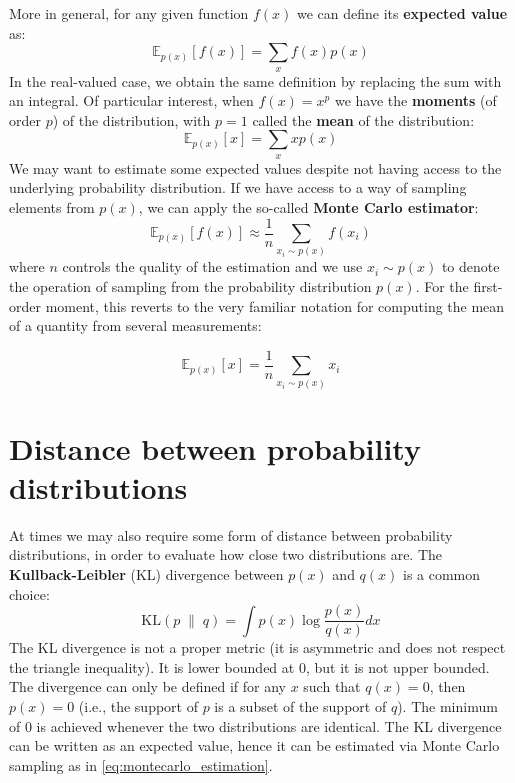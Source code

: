 More in general, for any given function $f(x)$ we can define its \textbf{expected value} as:
%
\begin{equation}
\mathbb{E}_{p(x)}\left[f(x)\right]=\sum_{x}f(x)p(x)
\label{eq:expected_value}
\end{equation}
%
In the real-valued case, we obtain the same definition by replacing the sum with an integral. Of particular interest, when $f(x)=x^p$ we have the \textbf{moments} (of order $p$) of the distribution, with $p=1$ called the \textbf{mean} of the distribution:
%
$$
\mathbb{E}_{p(x)}\left[x\right]=\sum_{x}xp(x)
$$
%
We may want to estimate some expected values despite not having access to the underlying probability distribution. If we have access to a way of sampling elements from $p(x)$, we can apply the so-called \textbf{Monte Carlo estimator}:
%
\begin{equation}
\mathbb{E}_{p(x)}\left[f(x)\right]\approx \frac{1}{n}\sum_{x_i \sim p(x)}f(x_i)
\label{eq:montecarlo_estimation}
\end{equation}
%
where $n$ controls the quality of the estimation and we use $x_i \sim p(x)$ to denote the operation of sampling from the probability distribution $p(x)$. For the first-order moment, this reverts to the very familiar notation for computing the mean of a quantity from several measurements:

$$
\mathbb{E}_{p(x)}\left[x\right]=\frac{1}{n}\sum_{x_i \sim p(x)}x_i
$$

\section{Distance between probability distributions}

At times we may also require some form of distance between probability distributions, in order to evaluate how close two distributions are. The \textbf{Kullback-Leibler} (KL) divergence between $p(x)$ and $q(x)$ is a common choice:
%
$$
\text{KL}(p \;\lVert\; q) = \int p(x)\log\frac{p(x)}{q(x)}dx
$$
%
The KL divergence is not a proper metric (it is asymmetric and does not respect the triangle inequality). It is lower bounded at 0, but it is not upper bounded. The divergence can only be defined if for any $x$ such that $q(x)=0$, then $p(x)=0$ (i.e., the support of $p$ is a subset of the support of $q$). The minimum of $0$ is achieved whenever the two distributions are identical. The KL divergence can be written as an expected value, hence it can be estimated via Monte Carlo sampling as in \eqref{eq:montecarlo_estimation}.

